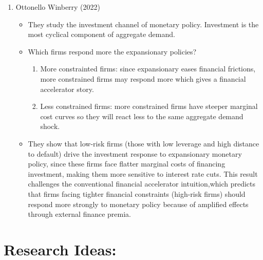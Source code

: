 \documentclass[10pt]{article}
\begin{document}
\begin{enumerate}
    \item Ottonello Winberry (2022)
    \begin{itemize}
        \item They study the investment channel of monetary policy. Investment is the most cyclical component of aggregate demand. 
        \item Which firms respond more the expansionary policies?
        \begin{enumerate}
            \item More constrainted firms: since expansionary eases financial frictions, more constrained firms may respond more which gives a financial accelerator story. 
            \item Less constrained firms: more constrained firms have steeper marginal cost curves so they will react less to the same aggregate demand shock.
        \end{enumerate}
        \item They show that low-risk firms (those with low leverage and high distance to default) drive the investment response to expansionary monetary policy, since these firms face flatter marginal costs of financing investment, making them more sensitive to interest rate cuts. This result  challenges the conventional financial accelerator intuition,which predicts that firms facing tighter financial constraints (high-risk firms) should respond more strongly to monetary policy because of amplified effects through external finance premia. 
    \end{itemize}
\end{enumerate}

\section{Research Ideas:}
\end{document}
